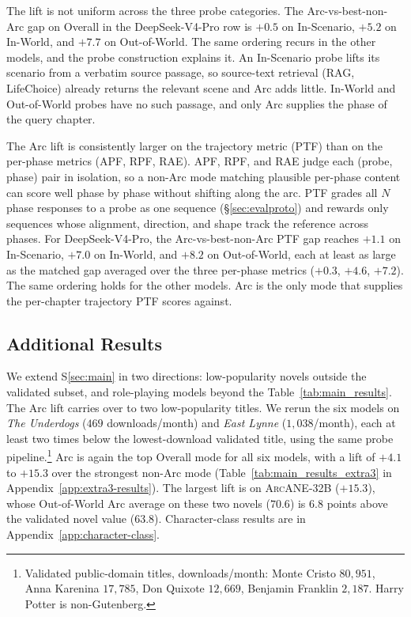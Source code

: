\documentclass{llmxive}
\providecommand{\ours}{\textsc{ArcANE}}
\begin{document}
The lift is not uniform across the three probe categories. The Arc-vs-best-non-Arc gap on Overall in the DeepSeek-V4-Pro row is $+0.5$ on In-Scenario, $+5.2$ on In-World, and $+7.7$ on Out-of-World. The same ordering recurs in the other models, and the probe construction explains it. An In-Scenario probe lifts its scenario from a verbatim source passage, so source-text retrieval (RAG, LifeChoice) already returns the relevant scene and Arc adds little. In-World and Out-of-World probes have no such passage, and only Arc supplies the phase of the query chapter.

The Arc lift is consistently larger on the trajectory metric (PTF) than on the per-phase metrics (APF, RPF, RAE). APF, RPF, and RAE judge each (probe, phase) pair in isolation, so a non-Arc mode matching plausible per-phase content can score well phase by phase without shifting along the arc. PTF grades all $N$ phase responses to a probe as one sequence (\S\ref{sec:evalproto}) and rewards only sequences whose alignment, direction, and shape track the reference across phases. For DeepSeek-V4-Pro, the Arc-vs-best-non-Arc PTF gap reaches $+1.1$ on In-Scenario, $+7.0$ on In-World, and $+8.2$ on Out-of-World, each at least as large as the matched gap averaged over the three per-phase metrics ($+0.3$, $+4.6$, $+7.2$). The same ordering holds for the other models. Arc is the only mode that supplies the per-chapter trajectory PTF scores against.


\subsection{Additional Results\label{sec:additional}}

We extend S\ref{sec:main} in two directions: low-popularity novels outside the validated subset, and role-playing models beyond the Table~\ref{tab:main_results}. The Arc lift carries over to two low-popularity titles. We rerun the six models on \emph{The Underdogs} ($469$ downloads/month) and \emph{East Lynne} ($1{,}038$/month), each at least two times below the lowest-download validated title, using the same probe pipeline.\footnote{Validated public-domain titles, downloads/month: Monte Cristo $80{,}951$, Anna Karenina $17{,}785$, Don Quixote $12{,}669$, Benjamin Franklin $2{,}187$. Harry Potter is non-Gutenberg.} Arc is again the top Overall mode for all six models, with a lift of $+4.1$ to $+15.3$ over the strongest non-Arc mode (Table~\ref{tab:main_results_extra3} in Appendix~\ref{app:extra3-results}). The largest lift is on \ours{}-32B ($+15.3$), whose Out-of-World Arc average on these two novels ($70.6$) is $6.8$ points above the validated novel value ($63.8$). Character-class results are in Appendix~\ref{app:character-class}.
\end{document}
